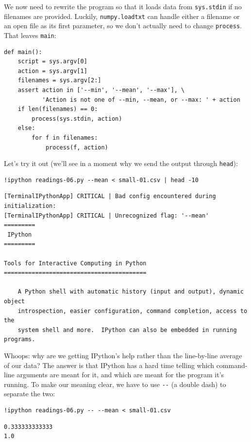 \documentclass[]{book}
\begin{document}
We now need to rewrite the program so that it loads data from
\texttt{sys.stdin} if no filenames are provided. Luckily,
\texttt{numpy.loadtxt} can handle either a filename or an open file as
its first parameter, so we don't actually need to change
\texttt{process}. That leaves \texttt{main}:

\begin{verbatim}
def main():
    script = sys.argv[0]
    action = sys.argv[1]
    filenames = sys.argv[2:]
    assert action in ['--min', '--mean', '--max'], \
           'Action is not one of --min, --mean, or --max: ' + action
    if len(filenames) == 0:
        process(sys.stdin, action)
    else:
        for f in filenames:
            process(f, action)
\end{verbatim}

Let's try it out (we'll see in a moment why we send the output through
\texttt{head}):

\begin{verbatim}
!ipython readings-06.py --mean < small-01.csv | head -10
\end{verbatim}

\begin{verbatim}
[TerminalIPythonApp] CRITICAL | Bad config encountered during initialization:
[TerminalIPythonApp] CRITICAL | Unrecognized flag: '--mean'
=========
 IPython
=========

Tools for Interactive Computing in Python
=========================================

    A Python shell with automatic history (input and output), dynamic object
    introspection, easier configuration, command completion, access to the
    system shell and more.  IPython can also be embedded in running programs.
\end{verbatim}

Whoops: why are we getting IPython's help rather than the line-by-line
average of our data? The answer is that IPython has a hard time telling
which command-line arguments are meant for it, and which are meant for
the program it's running. To make our meaning clear, we have to use
\texttt{-{}-} (a double dash) to separate the two:

\begin{verbatim}
!ipython readings-06.py -- --mean < small-01.csv
\end{verbatim}

\begin{verbatim}
0.333333333333
1.0
\end{verbatim}
\end{document}
